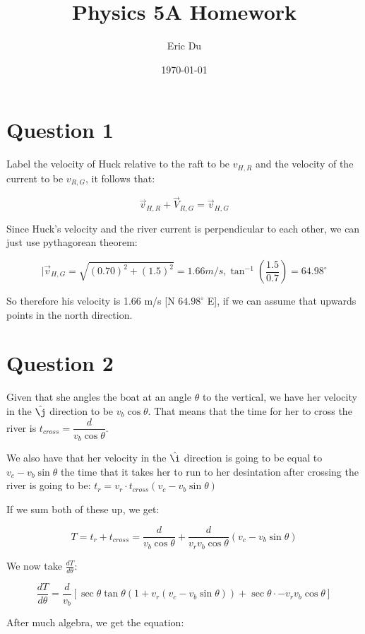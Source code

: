 \documentclass{article}
\title{Physics 5A Homework}
\author{Eric Du}
\date{\today}
\theoremstyle{definition}
\numberwithin{equation}{section}
\numberwithin{definition}{section}
\begin{document}
	
	\maketitle
	\tableofcontents
	
	
	
	\section{Question 1}
	
	Label the velocity of Huck relative to the raft to be $v_{H, R}$ and the velocity of the current to be $v_{R, G}$, it follows that:
	
	\[ \vec v_{H, R} + \vec V_{R, G} = \vec v_{H, G}\]
	
	Since Huck's velocity and the river current is perpendicular to each other, we can just use pythagorean theorem:
	
	\[ |\vec v_{H, G} = \sqrt{(0.70)^2 + (1.5)^2} = 1.66 m/s, \tan^{-1}\left(\frac{1.5}{0.7}\right) = 64.98^\circ\]
	
	So therefore his velocity is 1.66 m/s [N $64.98^\circ$ E], if we can assume that upwards points in the north direction.
	
	\section{Question 2}
	
		Given that she angles the boat at an angle $\theta$ to the vertical, we have her velocity in the $\hat \j$ direction to be $v_b\cos\theta$. That means that the time for her to cross the river is $t_{cross} = \dfrac{d}{v_b\cos\theta}$. 
	
	\medskip
	
	We also have that her velocity in the $\hat \i$ direction is going to be equal to $v_c - v_b\sin\theta$ the time that it takes her to run to her desintation after crossing the river is going to be: $t_{r} =  v_{r}\cdot t_{cross}(v_c - v_b\sin\theta)$
	
	If we sum both of these up, we get:
	
	\[ T = t_{r} + t_{cross} = \frac{d}{v_b\cos \theta} + \frac{d}{v_rv_b\cos\theta}(v_c - v_b\sin\theta)\]
	
	We now take $\frac{dT}{d\theta}$:
	
	\[\frac{dT}{d\theta} = \frac{d}{v_b} \left[\sec \theta \tan \theta (1 + v_{r}(v_c - v_b\sin\theta)) + \sec \theta\cdot -v_{r}v_b \cos \theta\right]\]
	
	After much algebra, we get the equation: 
	
\end{document}
